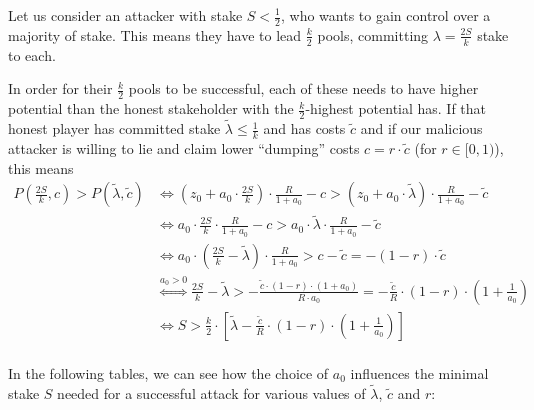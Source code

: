 \documentclass[11pt,a4paper]{article}
\begin{document}
Let us consider an attacker with stake \(S < \frac{1}{2}\), who wants to
gain control over a majority of stake. This means they have to lead
\(\frac{k}{2}\) pools, committing \(\lambda=\frac{2S}{k}\) stake to
each.

In order for their \(\frac{k}{2}\) pools to be successful, each of these
needs to have higher potential than the honest stakeholder with the
\(\frac{k}{2}\)-highest potential has. If that honest player has
committed stake \(\tilde{\lambda}\leq\frac{1}{k}\) and has costs
\(\tilde{c}\) and if our malicious attacker is willing to lie and claim
lower ``dumping'' costs \(c=r\cdot\tilde{c}\) (for \(r\in[0,1)\)), this
means \[
\begin{split}
    P\left(\frac{2S}{k}, c\right) > P(\tilde{\lambda}, \tilde{c})
    &\Longleftrightarrow
    \left(z_0+a_0\cdot\frac{2S}{k}\right)\cdot\frac{R}{1+a_0}-c > \left(z_0+a_0\cdot\tilde{\lambda}\right)\cdot\frac{R}{1+a_0}-\tilde{c} \\
    &\Longleftrightarrow
    a_0\cdot\frac{2S}{k}\cdot\frac{R}{1+a_0}-c > a_0\cdot\tilde{\lambda}\cdot\frac{R}{1+a_0}-\tilde{c} \\
    &\Longleftrightarrow
    a_0\cdot\left(\frac{2S}{k}-\tilde{\lambda}\right)\cdot\frac{R}{1+a_0} > c-\tilde{c}=-(1-r)\cdot\tilde{c} \\
    &\stackrel{a_0>0}{\Longleftrightarrow}
    \frac{2S}{k}-\tilde{\lambda} > -\frac{\tilde{c}\cdot(1-r)\cdot(1+a_0)}{R\cdot a_0} =
    -\frac{\tilde{c}}{R}\cdot(1-r)\cdot\left(1 + \frac{1}{a_0}\right) \\
    &\Longleftrightarrow
    S > \frac{k}{2}\cdot\left[\tilde{\lambda}-\frac{\tilde{c}}{R}\cdot(1-r)\cdot\left(1+\frac{1}{a_0}\right)\right] \\
\end{split}
\]

In the following tables, we can see how the choice of \(a_0\) influences
the minimal stake \(S\) needed for a successful attack for various
values of \(\tilde{\lambda}\), \(\tilde{c}\) and \(r\):
\end{document}

